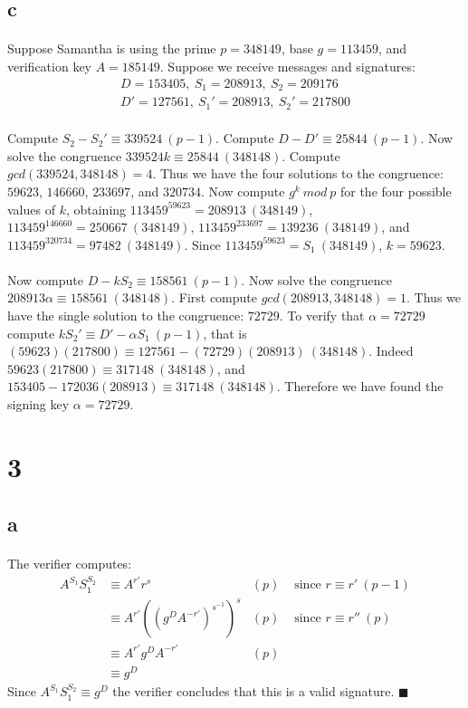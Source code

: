 \documentclass[letterpaper,12pt,oneside,onecolumn]{report}
\begin{document}
\subsection*{c}
\paragraph{}
Suppose Samantha is using the prime $p = 348149$, base $g=113459$, and verification key $A = 185149$. Suppose we receive messages and signatures:
\begin{align*}
D = 153405,\ S_1 = 208913,\ S_2 = 209176 \\
D' = 127561,\ S_1' = 208913,\ S_2' = 217800
\end{align*}
\paragraph{}
Compute $S_2 - S_2' \equiv 339524 \ (p-1)$. Compute $D - D' \equiv 25844\ (p-1)$. Now solve the congruence $339524k \equiv 25844\ (348148)$. Compute $gcd(339524, 348148) = 4$. Thus we have the four solutions to the congruence: $59623$, $146660$, $233697$, and $320734$. Now compute $g^k\ mod\ p$ for the four possible values of $k$, obtaining $113459^{59623}=208913\ (348149)$, $113459^{146660}=250667\ (348149)$, $113459^{233697}= 139236\ (348149)$, and $113459^{320734}=97482\ (348149)$. Since $113459^{59623}=S_1\ (348149)$, $k=59623$.
\paragraph{}
Now compute $D - kS_2 \equiv 158561\ (p-1)$. Now solve the congruence $208913\alpha \equiv 158561\ (348148)$. First compute $gcd(208913, 348148) = 1$. Thus we have the single solution to the congruence: $72729$. To verify that $\alpha = 72729$ compute $kS_2' \equiv D' - \alpha S_1\ (p-1)$, that is $(59623)(217800) \equiv 127561 - (72729)(208913)\ (348148)$. Indeed $59623(217800) \equiv 317148\ (348148)$, and $153405 - 172036(208913) \equiv 317148\ (348148)$.  Therefore we have found the signing key $\alpha = 72729$.
\section*{3}
\subsection*{a}
\paragraph{}
The verifier computes:
\begin{align*}
A^{S_1}S_1^{S_2} &\equiv A^{r'}r^{s} &(p) &\text{ since $r \equiv r'\ (p-1)$}\\
&\equiv A^{r'}((g^DA^{-r'})^{s^{-1}})^s &(p) &\text{ since $r \equiv r''\ (p)$}\\
&\equiv A^{r'}g^DA^{-r'} &(p) \\
&\equiv g^D
\end{align*}
Since $A^{S_1}S_1^{S_2} \equiv g^D$ the verifier concludes that this is a valid signature. $\blacksquare$
\end{document}
